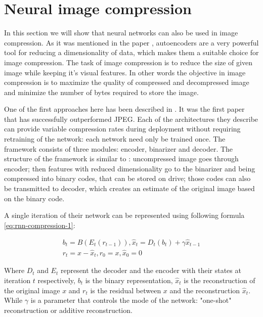 \chapter{Neural image compression}

In this section we will show that neural networks can also be used in image compression. As it was mentioned in the paper \cite[Reducing the Dimensionality of Data with Neural Networks]{Autoencoder_2006}, autoencoders are a very powerful tool for reducing a dimensionality of data, which makes them a suitable choice for image compression. The task of image compression is to reduce the size of given image while keeping it's visual features. In other words the objective in image compression is to maximize the quality of compressed and decompressed image and minimize the number of bytes required to store the image.

One of the first approaches here has been described in \cite{toderici_full_2017}. It was the first paper that has successfully outperformed JPEG. Each of the architectures they describe can provide variable compression rates during deployment without requiring retraining of the network: each network need only be trained once. The framework consists of three modules: encoder, binarizer and decoder. The structure of the framework is similar to \cite[Autoencoder]{Autoencoder_2006}: uncompressed image goes through encoder; then features with reduced dimensionality go to the binarizer and being compressed into binary codes, that can be stored on drive; those codes can also be transmitted to decoder, which creates an estimate of the original image based on the binary code.

A single iteration of their network can be represented using following formula \ref{eq:rnn-compression-1}:

\begin{equation}
    \label{eq:rnn-compression-1}
    \begin{split}
        b_t = B(E_t(r_{t-1})), \hat{x}_t = D_t(b_t) + \gamma \hat{x}_{t-1} \\
        r_t = x - \hat{x}_t, r_0 = x, \hat{x}_0 = 0
    \end{split}
\end{equation}

Where $D_t$ and $E_t$ represent the decoder and the encoder with their states at iteration $t$ respectively, $b_t$ is the binary representation, $\hat{x}_t$ is the reconstruction of the original image $x$ and $r_t$ is the residual between $x$ and the reconstruction $\hat{x}_t$. While $\gamma$ is a parameter that controls the mode of the network: "one-shot" reconstruction or additive reconstruction.

